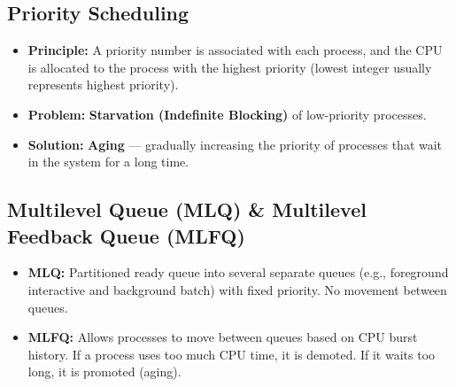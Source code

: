 \documentclass[12pt,a4paper]{article}
\begin{document}
\subsection{Priority Scheduling}
\begin{itemize}[leftmargin=*, itemsep=3pt]
  \item \textbf{Principle:} A priority number is associated with each process, and the CPU is allocated to the process with the highest priority (lowest integer usually represents highest priority).
  \item \textbf{Problem:} \textbf{Starvation (Indefinite Blocking)} of low-priority processes.
  \item \textbf{Solution:} \textbf{Aging} --- gradually increasing the priority of processes that wait in the system for a long time.
\end{itemize}

\subsection{Multilevel Queue (MLQ) \& Multilevel Feedback Queue (MLFQ)}
\begin{itemize}[leftmargin=*, itemsep=3pt]
  \item \textbf{MLQ:} Partitioned ready queue into several separate queues (e.g., foreground interactive and background batch) with fixed priority. No movement between queues.
  \item \textbf{MLFQ:} Allows processes to move between queues based on CPU burst history. If a process uses too much CPU time, it is demoted. If it waits too long, it is promoted (aging).
\end{itemize}

\begin{tcolorbox}[tikzbox, title={Multilevel Feedback Queue Structure}]
\centering
{}
\end{tcolorbox}
\end{document}
